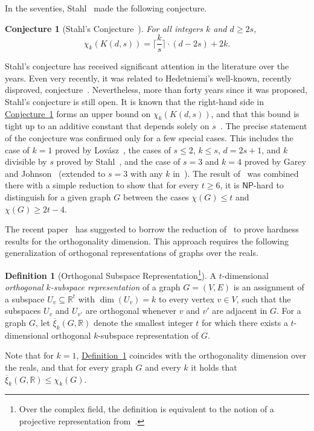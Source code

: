\documentclass[11pt]{article}
\numberwithin{equation}{section}
\newtheorem{conjecture}[theorem]{Conjecture}
\theoremstyle{definition}
\newtheorem{definition}[theorem]{Definition}
\theoremstyle{plain}
\newcommand{\R}{\mathbb R}
\newcommand{\expref}[2]{\hyperref[#2]{#1~\ref{#2}}}
\newcommand{\NP}{\mathsf{NP}}
\newcommand{\od}{\overline{\xi}}
\begin{document}
In the seventies, Stahl~\cite{Stahl76} made the following conjecture.
\begin{conjecture}[Stahl's Conjecture~\cite{Stahl76}]\label{conj:Stahl}
For all integers $k$ and $d \geq 2s$,
\[\chi_k(K(d,s)) = \Big \lceil \frac{k}{s} \Big \rceil \cdot (d-2s)+2k.\]
\end{conjecture}
\noindent
Stahl's conjecture has received significant attention in the literature over
the years. Even very recently, it was related to
%
%
Hedetniemi's well-known, recently disproved, conjecture~\cite{TradifZ19}. %
Nevertheless, more than forty years since it was proposed, Stahl's conjecture
is still open.
It is known that the right-hand side in \expref{Conjecture}{conj:Stahl} forms an upper bound on $\chi_k(K(d,s))$, and that this bound is tight up to an additive constant that depends solely on $s$~\cite{CGJ78,Stahl98}.
The precise statement of the conjecture was confirmed only for a few special cases. This includes the case of $k=1$ proved by Lov\'asz~\cite{LovaszKneser}, the cases of $s \leq 2$, $k \leq s$, $d=2s+1$, and $k$ divisible by $s$ proved by Stahl~\cite{Stahl76,Stahl98}, and the case of $s=3$ and $k=4$ proved by Garey and Johnson~\cite{GareyJ76a} (extended to $s=3$ with any $k$ in~\cite{Stahl98}). The result of~\cite{GareyJ76a} was combined there with a simple reduction to show that for every $t \geq 6$, it is $\NP$-hard 
%
%
to distinguish for a given graph $G$ between the cases $\chi(G) \leq t$ and $\chi(G) \geq 2t-4$.

The recent %
paper~\cite{HavivMFCS19}  %
has suggested to borrow the reduction of~\cite{GareyJ76a} to prove hardness results for the orthogonality dimension.
%
%
This approach requires the following generalization of orthogonal representations of graphs over the reals.

\begin{definition}[Orthogonal Subspace Representation\footnote{Over the complex field, the definition is equivalent to the notion of a projective representation from~\cite[Definition~6.1]{manvcinska2016quantum}.}]\label{def:ortho_k-subspace}
%
%
A $t$-dimensional \emph{orthogonal $k$-subspace representation} of a graph $G=(V,E)$ is an assignment of a subspace $U_v \subseteq \R^t$ with $\dim (U_v)=k$ to every vertex $v \in V$, such that the subspaces $U_v$ and $U_{v'}$ are orthogonal whenever $v$ and $v'$ are adjacent in $G$. For a graph $G$, let $\od_k(G,\R)$ denote the smallest integer $t$ for which there exists a $t$-dimensional orthogonal $k$-subspace representation of $G$.
\end{definition}
\noindent
Note that for $k=1$, \expref{Definition}{def:ortho_k-subspace} coincides with the orthogonality dimension over the reals, and that for every graph $G$ and every $k$ it holds that $\od_k(G,\R) \leq \chi_k(G)$.
\end{document}
